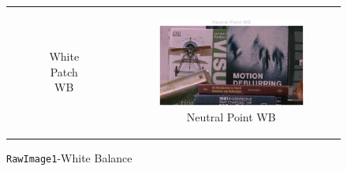 \documentclass[11pt, a4]{article}
\begin{document}
\begin{enumerate}
\begin{enumerate}
\begin{figure}[h]
{\begin{tabular}{cc}
\begin{subfigure}[h]{0.45\linewidth}
							\caption{White Patch WB}
							\label{fig:RawImage1_WB_3}
						\end{subfigure} &
						\begin{subfigure}[h]{0.45\linewidth}
							\centering
							\includegraphics[width=\linewidth]{../output/RawImage1_WB_4.pdf}
							\caption{Neutral Point WB}
							\label{fig:RawImage1_WB_4}
						\end{subfigure}
					\end{tabular}
				}
				\caption{\texttt{RawImage1}-White Balance}
				\label{fig:RawImage1_WB}
			\end{figure}
			

\end{enumerate}
\end{enumerate}
\end{document}
